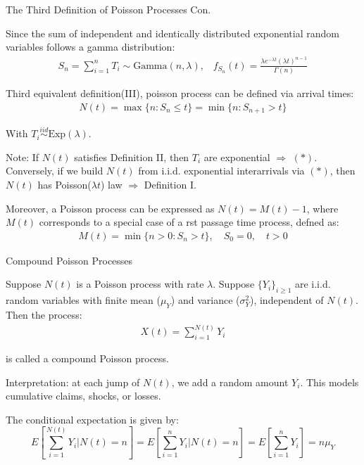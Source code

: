 \documentclass{beamer}
\begin{document}
\begin{frame}{The Third Definition of Poisson Processes Con.}

    {\footnotesize \footnotesize
   \par  Since the sum of independent and identically distributed exponential random variables follows a gamma distribution:
   \begin{align*}
    S_n = \sum_{i=1}^n T_i \sim \text{Gamma}(n, \lambda),\;\;\; f_{S_n}(t) = \frac{\lambda e^{-\lambda t} (\lambda t)^{n-1}}{\Gamma(n)}
   \end{align*}
    \par  Third equivalent definition(III), poisson process can be defined via arrival times:
    \begin{align*}
        N(t) = \max\{n : S_n \leq t\} = \min\{n : S_{n+1} > t\} \tag{*}
    \end{align*}
    \par With \( T_i \overset{iid}{\sim} \text{Exp}(\lambda) \).
    \vspace{1em}
    \par Note: If \( N(t) \) satisfies Definition II, then \( T_i \) are exponential \(\Rightarrow\) $(*)$. 
    Conversely, if we build \( N(t) \) from i.i.d. exponential interarrivals via $(*)$, 
    then \( N(t) \) has Poisson(\(\lambda t\)) law \(\Rightarrow\) Definition I.
     \vspace{1em}
    \par Moreover, a Poisson process can be expressed as \( N(t) = M(t) - 1 \), where $M(t)$ corresponds to a special case of a rst passage
    time process, defned as:
    \begin{align*}
        M(t) = \min\{n > 0 : S_n > t\}, \quad S_0 = 0, \quad t > 0
    \end{align*}

    }
    
\end{frame}

\begin{frame}{Compound Poisson Processes}

    {\footnotesize \footnotesize
    \par  Suppose \( N(t) \) is a Poisson process with rate \(\lambda\).
    Suppose \(\{Y_i\}_{i \geq 1}\) are i.i.d. random variables with finite mean ($\mu_Y$) and variance ($\sigma^2_Y$), independent of \(N(t)\). Then the process:
    \begin{align*}
        X(t) = \sum_{i=1}^{N(t)} Y_i
    \end{align*}
    \par  is called a compound Poisson process.
    \vspace{1em}
    \par Interpretation: at each jump of \(N(t)\), we add a random amount \(Y_i\). This models cumulative claims, shocks, or losses.
    \vspace{1em}
    \par The conditional expectation is given by:
        \[
        E \left[ \sum_{i=1}^{N(t)} Y_i | N(t) = n \right] = E \left[ \sum_{i=1}^n Y_i | N(t) = n \right] = E \left[ \sum_{i=1}^n Y_i \right] = n \mu_Y
        \]
    }
    
\end{frame}
\end{document}
